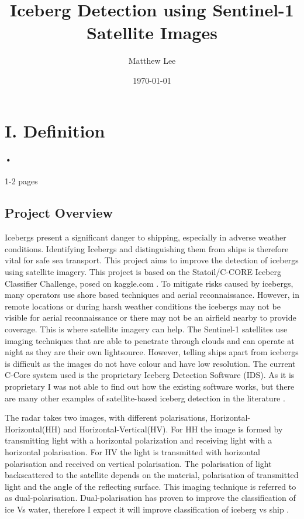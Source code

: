 \documentclass{article}
\begin{document}
\title{Iceberg Detection using Sentinel-1 Satellite Images}
\author{Matthew Lee}
\date{\today}
\maketitle{}
\newpage{}
\section{I. Definition}
\paragraph{•}
1-2 pages


\subsection{Project Overview}
Icebergs present a significant danger to shipping, especially in adverse weather conditions. Identifying Icebergs and distinguishing them from ships is therefore vital for safe sea transport. This project aims to improve the detection of icebergs using satellite imagery. This project is based on the Statoil/C-CORE Iceberg Classifier Challenge, posed on kaggle.com \cite{kaggle}. To mitigate risks caused by icebergs, many operators use shore based techniques and aerial reconnaissance. However, in remote locations or during harsh weather conditions the icebergs may not be visible for aerial reconnaissance or there may not be an airfield nearby to provide coverage. This is where satellite imagery can help. The Sentinel-1 satellites use imaging techniques that are able to penetrate through clouds and can operate at night as they are their own lightsource. However, telling ships apart from icebergs is difficult as the images do not have colour and have low resolution. The current C-Core system used is the proprietary Iceberg Detection Software (IDS). As it is proprietary I was not able to find out how the existing software works, but there are many other examples of satellite-based iceberg detection in the literature  \cite{c-core,bentes}. 

The radar takes two images, with different polarisations,  Horizontal-Horizontal(HH) and Horizontal-Vertical(HV). For HH the image is formed by transmitting light with a horizontal polarization and receiving light with a horizontal polarisation. For HV the light is transmitted with horizontal polarisation and received on vertical polarisation. The polarisation of light backscattered to the satellite depends on the material, polarisation of transmitted light and the angle of the reflecting surface. This imaging technique is referred to as dual-polarisation. Dual-polarisation has proven to improve the classification of ice Vs water, therefore I expect it will improve classification of iceberg vs ship \cite{radarsat-mode-selection,yu}. 
\end{document}
